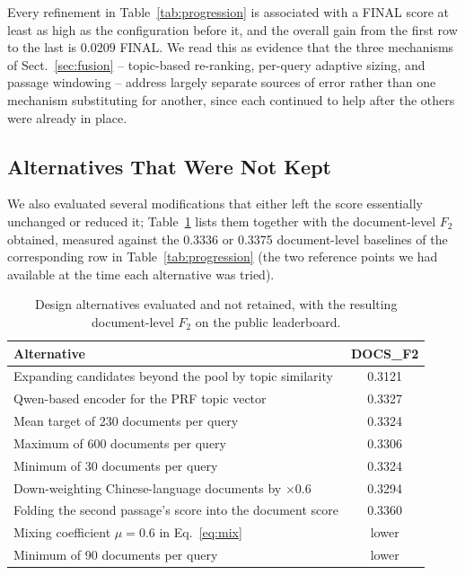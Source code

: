\documentclass[runningheads]{llncs}
\begin{document}
Every refinement in Table~\ref{tab:progression} is associated with a FINAL
score at least as high as the configuration before it, and the overall gain
from the first row to the last is $0.0209$ FINAL. We read this as evidence
that the three mechanisms of Sect.~\ref{sec:fusion} -- topic-based
re-ranking, per-query adaptive sizing, and passage windowing -- address
largely separate sources of error rather than one mechanism substituting for
another, since each continued to help after the others were already in
place.

\subsection{Alternatives That Were Not Kept}
\label{sec:rejected}

We also evaluated several modifications that either left the score
essentially unchanged or reduced it; Table~\ref{tab:rejected} lists them
together with the document-level $F_2$ obtained, measured against the
0.3336 or 0.3375 document-level baselines of the corresponding row in
Table~\ref{tab:progression} (the two reference points we had available at
the time each alternative was tried).

\begin{table}[H]
\centering
\caption{Design alternatives evaluated and not retained, with the resulting
document-level $F_2$ on the public leaderboard.}
\label{tab:rejected}
\footnotesize
\setlength{\tabcolsep}{4pt}
\begin{tabular}{lc}
\hline
Alternative & DOCS\_F2 \\
\hline
Expanding candidates beyond the pool by topic similarity & 0.3121 \\
Qwen-based encoder for the PRF topic vector & 0.3327 \\
Mean target of 230 documents per query & 0.3324 \\
Maximum of 600 documents per query & 0.3306 \\
Minimum of 30 documents per query & 0.3324 \\
Down-weighting Chinese-language documents by $\times 0.6$ & 0.3294 \\
Folding the second passage's score into the document score & 0.3360 \\
Mixing coefficient $\mu = 0.6$ in Eq.~\eqref{eq:mix} & lower \\
Minimum of 90 documents per query & lower \\
\hline
\end{tabular}
\end{table}
\end{document}
